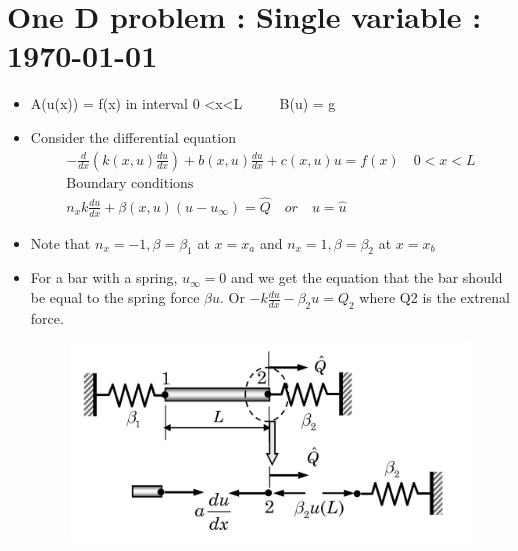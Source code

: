 




	\tableofcontents

\section{One D problem : Single variable : \today}
	\begin{frame}
		\begin{itemize}
			\item A(u(x)) = f(x) in interval 0 <x<L $\qquad$ B(u) = g
			\item Consider the differential equation
			\begin{equation}
			\begin{aligned}
				-\frac{d}{dx}\left(k(x,u) \frac{du}{dx} \right) + b(x,u)\frac{du}{dx} + c(x,u)u = f(x) \quad 0<x<L \\
				\text{Boundary conditions}\\
				n_xk\frac{du}{dx} + \beta(x,u)(u-u_{\infty}) = \hat{Q}   \quad or \quad u = \hat{u}
			\end{aligned}
			\end{equation}
			\item Note that $n_x=-1, \beta = \beta_1$ at $x = x_a$ and $n_x=1, \beta = \beta_2$ at $x = x_b$
			\item For a bar with a spring, $u_{\infty} = 0$ and we get the equation that the bar should be equal to the spring force $\beta u$. Or $-k\frac{du}{dx}-\beta_2u = Q_2 $ where Q2 is the extrenal force.
			\begin{figure}
				\centering
				\includegraphics[width=0.7\linewidth]{Figure/fig9} 
			\end{figure} 
		\end{itemize}
	\end{frame}


